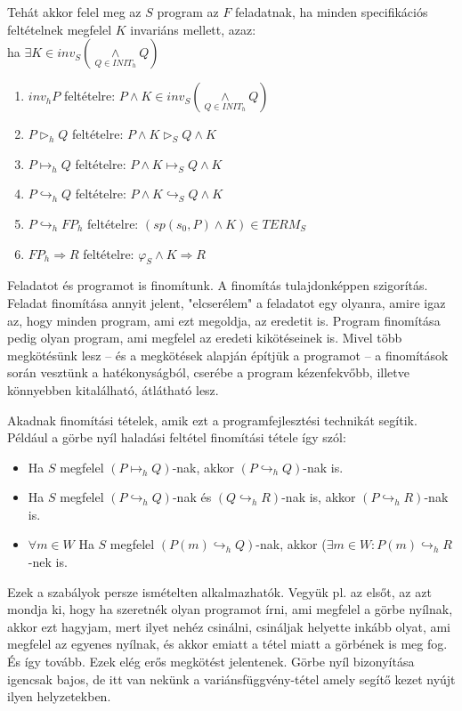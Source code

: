 \documentclass{article}
\begin{document}
Tehát akkor felel meg az $S$ program az $F$ feladatnak, ha minden specifikációs feltételnek megfelel $K$ invariáns mellett, azaz:\\
ha $\exists K \in inv_S(\underset{Q\in INIT_h}{\land}Q)$

\begin{enumerate}
\item $inv_h P$ feltételre: $P \land K \in inv_S(\underset{Q\in INIT_h}{\land}Q)$
\item $P \triangleright_h Q$ feltételre: $P \land K \triangleright_S Q \land K$
\item $P \mapsto_h Q$ feltételre: $P \land K \mapsto_S Q \land K$
\item $P \hookrightarrow_h Q$ feltételre: $P \land K \hookrightarrow_S Q \land K$
\item $P \hookrightarrow_h FP_h$ feltételre: $(sp(s_0, P) \land K) \in TERM_S$
\item $FP_h \Rightarrow R$ feltételre: $\varphi_S \land K \Rightarrow R$
\end{enumerate}

Feladatot és programot is finomítunk. A finomítás tulajdonképpen szigorítás. Feladat finomítása annyit jelent, "elcserélem" a feladatot egy olyanra, amire igaz az, hogy minden program, ami ezt megoldja, az eredetit is. Program finomítása pedig olyan program, ami megfelel az eredeti kikötéseinek is. Mivel több megkötésünk lesz -- és a megkötések alapján építjük a programot -- a finomítások során vesztünk a hatékonyságból, cserébe a program kézenfekvőbb, illetve könnyebben kitalálható, átlátható lesz.

Akadnak finomítási tételek, amik ezt a programfejlesztési technikát segítik. Például a görbe nyíl haladási feltétel finomítási tétele így szól:
\begin{itemize}
\item Ha $S$ megfelel $(P \mapsto_h Q)$-nak, akkor $(P \hookrightarrow_h Q)$-nak is.
\item Ha $S$ megfelel $(P \hookrightarrow_h Q)$-nak és $(Q \hookrightarrow_h R)$-nak is, akkor $(P \hookrightarrow_h R)$-nak is.
\item $\forall m \in W$ Ha $S$ megfelel $(P(m) \hookrightarrow_h Q)$-nak, akkor ($\exists m \in W : P(m) \hookrightarrow_h R$-nek is.
\end{itemize}

Ezek a szabályok persze ismételten alkalmazhatók. Vegyük pl. az elsőt, az azt mondja ki, hogy ha szeretnék olyan programot írni, ami megfelel a görbe nyílnak, akkor ezt hagyjam, mert ilyet nehéz csinálni, csináljak helyette inkább olyat, ami megfelel az egyenes nyílnak, és akkor emiatt a tétel miatt a görbének is meg fog. És így tovább. Ezek elég erős megkötést jelentenek. Görbe nyíl bizonyítása igencsak bajos, de itt van nekünk a variánsfüggvény-tétel amely segítő kezet nyújt ilyen helyzetekben.
\end{document}
